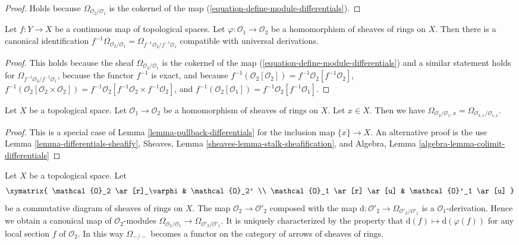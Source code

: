 \begin{proof}
Holds because $\Omega_{\mathcal{O}_2/\mathcal{O}_1}$
is the cokernel of the map (\ref{equation-define-module-differentials}).
\end{proof}

\begin{lemma}
\label{lemma-pullback-differentials}
Let $f : Y \to X$ be a continuous map of topological spaces.
Let $\varphi : \mathcal{O}_1 \to \mathcal{O}_2$
be a homomorphism of sheaves of rings on $X$.
Then there is a canonical identification
$f^{-1}\Omega_{\mathcal{O}_2/\mathcal{O}_1} =
\Omega_{f^{-1}\mathcal{O}_2/f^{-1}\mathcal{O}_1}$
compatible with universal derivations.
\end{lemma}

\begin{proof}
This holds because the sheaf $\Omega_{\mathcal{O}_2/\mathcal{O}_1}$
is the cokernel of the map (\ref{equation-define-module-differentials})
and a similar statement holds for
$\Omega_{f^{-1}\mathcal{O}_2/f^{-1}\mathcal{O}_1}$,
because the functor $f^{-1}$ is exact, and because
$f^{-1}(\mathcal{O}_2[\mathcal{O}_2]) =
f^{-1}\mathcal{O}_2[f^{-1}\mathcal{O}_2]$,
$f^{-1}(\mathcal{O}_2[\mathcal{O}_2 \times \mathcal{O}_2]) =
f^{-1}\mathcal{O}_2[f^{-1}\mathcal{O}_2 \times f^{-1}\mathcal{O}_2]$, and
$f^{-1}(\mathcal{O}_2[\mathcal{O}_1]) =
f^{-1}\mathcal{O}_2[f^{-1}\mathcal{O}_1]$.
\end{proof}

\begin{lemma}
\label{lemma-stalk-module-differentials}
Let $X$ be a topological space. Let $\mathcal{O}_1 \to \mathcal{O}_2$
be a homomorphism of sheaves of rings on $X$. Let $x \in X$. Then we have
$\Omega_{\mathcal{O}_2/\mathcal{O}_1, x} =
\Omega_{\mathcal{O}_{2, x}/\mathcal{O}_{1, x}}$.
\end{lemma}

\begin{proof}
This is a special case of Lemma \ref{lemma-pullback-differentials}
for the inclusion map $\{x\} \to X$. An alternative proof is the use
Lemma \ref{lemma-differentials-sheafify},
Sheaves, Lemma \ref{sheaves-lemma-stalk-sheafification}, and
Algebra, Lemma \ref{algebra-lemma-colimit-differentials}
\end{proof}

\begin{lemma}
\label{lemma-functoriality-differentials}
Let $X$ be a topological space. Let
$$
\xymatrix{
\mathcal{O}_2 \ar[r]_\varphi & \mathcal{O}_2' \\
\mathcal{O}_1 \ar[r] \ar[u] & \mathcal{O}'_1 \ar[u]
}
$$
be a commutative diagram of sheaves of rings on $X$. The map
$\mathcal{O}_2 \to \mathcal{O}'_2$ composed with the map
$\text{d} : \mathcal{O}'_2 \to \Omega_{\mathcal{O}'_2/\mathcal{O}'_1}$
is a $\mathcal{O}_1$-derivation. Hence we obtain a canonical map of
$\mathcal{O}_2$-modules
$\Omega_{\mathcal{O}_2/\mathcal{O}_1} \to
\Omega_{\mathcal{O}'_2/\mathcal{O}'_1}$.
It is uniquely characterized by the property that
$\text{d}(f) \mapsto \text{d}(\varphi(f))$
for any local section $f$ of $\mathcal{O}_2$.
In this way $\Omega_{-/-}$ becomes a functor on the category
of arrows of sheaves of rings.
\end{lemma}

